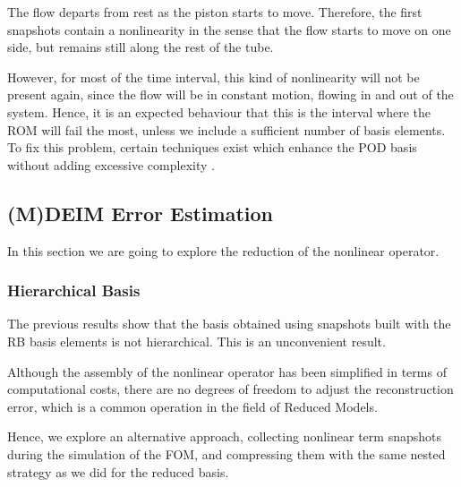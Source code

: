 \documentclass[../../thesis.tex]{subfiles}
\begin{document}
The flow departs from rest as the piston starts to move.
Therefore, the first snapshots contain a nonlinearity in the sense that the flow starts to move on one side, 
but remains still along the rest of the tube.

However, for most of the time interval, this kind of nonlinearity will not be present again,
since the flow will be in constant motion, flowing in and out of the system.
Hence, it is an expected behaviour that this is the interval where the ROM will fail the most,
unless we include a sufficient number of basis elements.
To fix this problem, certain techniques exist which enhance the POD basis 
without adding excessive complexity \cite{weightedPOD}.

\subsection{(M)DEIM Error Estimation}
In this section we are going to explore the reduction of the nonlinear operator.

\subsubsection{Hierarchical Basis}
The previous results show that the basis obtained using
snapshots built with the RB basis elements is not hierarchical.
This is an unconvenient result.

Although the assembly of the nonlinear operator has been simplified
in terms of computational costs,
there are no degrees of freedom to adjust the reconstruction error,
which is a common operation in the field of Reduced Models.

Hence, we explore an alternative approach, collecting nonlinear term snapshots 
during the simulation of the FOM, and compressing them with the same 
nested strategy as we did for the reduced basis.
\end{document}
